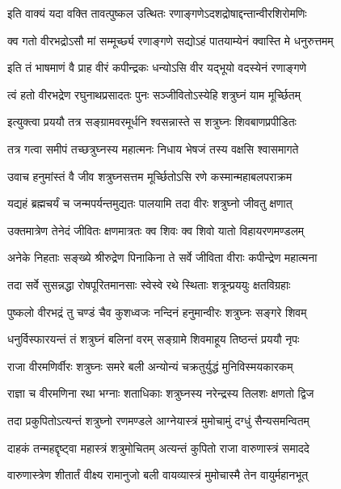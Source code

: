 \twolineshloka
{इति वाक्यं यदा वक्ति तावत्पुष्कल उत्थितः}
{रणाङ्गणेऽदशद्रोषाद्दन्तान्वीरशिरोमणिः}%

\twolineshloka
{क्व गतो वीरभद्रोऽसौ मां सम्मूर्च्छ्य रणाङ्गणे}
{सद्योऽहं पातयाम्येनं क्वास्ति मे धनुरुत्तमम्}%

\twolineshloka
{इति तं भाषमाणं वै प्राह वीरं कपीन्द्रकः}
{धन्योऽसि वीर यद्भूयो वदस्येनं रणाङ्गणे}%

\twolineshloka
{त्वं हतो वीरभद्रेण रघुनाथप्रसादतः}
{पुनः सञ्जीवितोऽस्येहि शत्रुघ्नं याम मूर्च्छितम्}%

\twolineshloka
{इत्युक्त्वा प्रययौ तत्र सङ्ग्रामवरमूर्धनि}
{श्वसन्नास्ते स शत्रुघ्नः शिवबाणप्रपीडितः}%

\twolineshloka
{तत्र गत्वा समीपं तच्छत्रुघ्नस्य महात्मनः}
{निधाय भेषजं तस्य वक्षसि श्वासमागते}%

\twolineshloka
{उवाच हनुमांस्तं वै जीव शत्रुघ्नसत्तम}
{मूर्च्छितोऽसि रणे कस्मान्महाबलपराक्रम}%

\twolineshloka
{यद्यहं ब्रह्मचर्यं च जन्मपर्यन्तमुद्यतः}
{पालयामि तदा वीरः शत्रुघ्नो जीवतु क्षणात्}%

\twolineshloka
{उक्तमात्रेण तेनेदं जीवितः क्षणमात्रतः}
{क्व शिवः क्व शिवो यातो विहायरणमण्डलम्}%

\twolineshloka
{अनेके निहताः सङ्ख्ये श्रीरुद्रेण पिनाकिना}
{ते सर्वे जीविता वीराः कपीन्द्रेण महात्मना}%

\twolineshloka
{तदा सर्वे सुसन्नद्धा रोषपूरितमानसाः}
{स्वेस्वे रथे स्थिताः शत्रून्प्रययुः क्षतविग्रहाः}%

\twolineshloka
{पुष्कलो वीरभद्रं तु चण्डं चैव कुशध्वजः}
{नन्दिनं हनुमान्वीरः शत्रुघ्नः सङ्गरे शिवम्}%

\twolineshloka
{धनुर्विस्फारयन्तं तं शत्रुघ्नं बलिनां वरम्}
{सङ्ग्रामे शिवमाहूय तिष्ठन्तं प्रययौ नृपः}%

\twolineshloka
{राजा वीरमणिर्वीरः शत्रुघ्नः समरे बली}
{अन्योन्यं चक्रतुर्युद्धं मुनिविस्मयकारकम्}%

\twolineshloka
{राज्ञा च वीरमणिना रथा भग्नाः शताधिकाः}
{शत्रुघ्नस्य नरेन्द्रस्य तिलशः क्षणतो द्विज}%

\twolineshloka
{तदा प्रकुपितोऽत्यन्तं शत्रुघ्नो रणमण्डले}
{आग्नेयास्त्रं मुमोचामुं दग्धुं सैन्यसमन्वितम्}%

\twolineshloka
{दाहकं तन्महद्दृष्ट्वा महास्त्रं शत्रुमोचितम्}
{अत्यन्तं कुपितो राजा वारुणास्त्रं समाददे}%

\twolineshloka
{वारुणास्त्रेण शीतार्तं वीक्ष्य रामानुजो बली}
{वायव्यास्त्रं मुमोचास्मै तेन वायुर्महानभूत्}%

